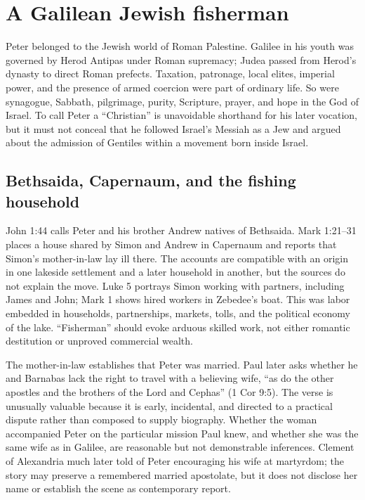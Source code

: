 \section{A Galilean Jewish fisherman}\label{sec:peter-world}

Peter belonged to the Jewish world of Roman Palestine. Galilee in his youth
was governed by Herod Antipas under Roman supremacy; Judea passed from Herod's
dynasty to direct Roman prefects. Taxation, patronage, local elites, imperial
power, and the presence of armed coercion were part of ordinary life. So were
synagogue, Sabbath, pilgrimage, purity, Scripture, prayer, and hope in the God
of Israel. To call Peter a ``Christian'' is unavoidable shorthand for his
later vocation, but it must not conceal that he followed Israel's Messiah as
a Jew and argued about the admission of Gentiles within a movement born
inside Israel.

\subsection{Bethsaida, Capernaum, and the fishing household}

John 1:44 calls Peter and his brother Andrew natives of Bethsaida.
Mark 1:21--31 places a house shared by Simon and Andrew in Capernaum and reports that
Simon's mother-in-law lay ill there. The accounts are compatible with an
origin in one lakeside settlement and a later household in another, but the
sources do not explain the move. Luke 5 portrays Simon working with partners,
including James and John; Mark 1 shows hired workers in Zebedee's boat. This
was labor embedded in households, partnerships, markets, tolls, and the
political economy of the lake. ``Fisherman'' should evoke arduous skilled
work, not either romantic destitution or unproved commercial wealth.

The mother-in-law establishes that Peter was married. Paul later asks whether
he and Barnabas lack the right to travel with a believing wife, ``as do the
other apostles and the brothers of the Lord and Cephas'' (1 Cor 9:5). The
verse is unusually valuable because it is early, incidental, and directed to
a practical dispute rather than composed to supply biography. Whether the
woman accompanied Peter on the particular mission Paul knew, and whether she
was the same wife as in Galilee, are reasonable but not demonstrable
inferences. Clement of Alexandria much later told of Peter encouraging his
wife at martyrdom; the story may preserve a remembered married apostolate, but
it does not disclose her name or establish the scene as contemporary report.

